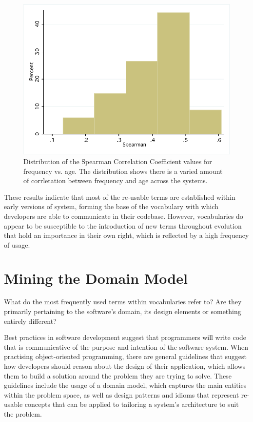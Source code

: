 \begin{figure}[t]
\centering
\includegraphics[width=\textwidth]{Figures/Vocab-FrequencyAgeSpearmanDist.pdf}
\caption{Distribution of the Spearman Correlation Coefficient values for frequency vs. age. The distribution shows there is a varied amount of corrletation between frequency and age across the systems.}
\label{fig:vocab-freqage-spearman-dist}
\end{figure}

These results indicate that most of the re-usable terms are established within early versions of system, forming the base of the vocabulary with which developers are able to communicate in their codebase. However, vocabularies do appear to be susceptible to the introduction of new terms throughout evolution that hold an importance in their own right, which is reflected by a high frequency of usage.



\section{Mining the Domain Model} %
\label{sec:mining_the_domain_model}

What do the most frequently used terms within vocabularies refer to? Are they primarily pertaining to the software's domain, its design elements or something entirely different?

Best practices in software development suggest that programmers will write code that is communicative of the purpose and intention of the software system. When practising object-oriented programming, there are general guidelines that suggest how developers should reason about the design of their application, which allows them to build a solution around the problem they are trying to solve. These guidelines include the usage of a domain model, which captures the main entities within the problem space, as well as design patterns and idioms that represent re-usable concepts that can be applied to tailoring a system's architecture to suit the problem.

